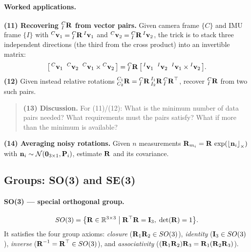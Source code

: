 \paragraph{Worked applications.}
\textbf{(11) Recovering ${}^{C}_{I}\boldsymbol{\mathbf{R}}$ from vector pairs.} Given camera frame $\{C\}$ and IMU frame $\{I\}$ with ${}^{C}\boldsymbol{\mathbf{v}}_1 = {}^{C}_{I}\boldsymbol{\mathbf{R}}\,{}^{I}\boldsymbol{\mathbf{v}}_1$ and ${}^{C}\boldsymbol{\mathbf{v}}_2 = {}^{C}_{I}\boldsymbol{\mathbf{R}}\,{}^{I}\boldsymbol{\mathbf{v}}_2$, the trick is to stack three independent directions (the third from the cross product) into an invertible matrix:
\begin{align}
\big[\,{}^{C}\boldsymbol{\mathbf{v}}_1 \;\; {}^{C}\boldsymbol{\mathbf{v}}_2 \;\; {}^{C}\boldsymbol{\mathbf{v}}_1\times{}^{C}\boldsymbol{\mathbf{v}}_2\,\big]
= {}^{C}_{I}\boldsymbol{\mathbf{R}}\,\big[\,{}^{I}\boldsymbol{\mathbf{v}}_1 \;\; {}^{I}\boldsymbol{\mathbf{v}}_2 \;\; {}^{I}\boldsymbol{\mathbf{v}}_1\times{}^{I}\boldsymbol{\mathbf{v}}_2\,\big].
\end{align}
\textbf{(12)} Given instead relative rotations ${}^{C_1}_{C_2}\boldsymbol{\mathbf{R}} = {}^{C}_{I}\boldsymbol{\mathbf{R}}\,{}^{I_1}_{I_2}\boldsymbol{\mathbf{R}}\,{}^{C}_{I}\boldsymbol{\mathbf{R}}^\top$, recover ${}^{C}_{I}\boldsymbol{\mathbf{R}}$ from two such pairs.
\begin{quote}
\textbf{(13) Discussion.} For (11)/(12): What is the minimum number of data pairs needed? What requirements must the pairs satisfy? What if more than the minimum is available?
\end{quote}
\textbf{(14) Averaging noisy rotations.} Given $n$ measurements $\boldsymbol{\mathbf{R}}_{m_i} = \boldsymbol{\mathbf{R}}\,\exp(\left\lfloor\boldsymbol{\mathbf{n}}_i\right\rfloor_{\times})$ with $\boldsymbol{\mathbf{n}}_i\sim\mathcal{N}(\boldsymbol{\mathbf{0}}_{3\times1},\boldsymbol{\mathbf{P}}_i)$, estimate $\boldsymbol{\mathbf{R}}$ and its covariance.

\subsection{Groups: SO(3) and SE(3)}

\paragraph{SO(3) --- special orthogonal group.}
\begin{align}
SO(3) = \big\{\boldsymbol{\mathbf{R}}\in\mathbb{R}^{3\times3} \;\big|\; \boldsymbol{\mathbf{R}}^\top\boldsymbol{\mathbf{R}} = \boldsymbol{\mathbf{I}}_3,\;\det(\boldsymbol{\mathbf{R}}) = 1\big\}.
\end{align}
It satisfies the four group axioms: \emph{closure} ($\boldsymbol{\mathbf{R}}_1\boldsymbol{\mathbf{R}}_2\in SO(3)$), \emph{identity} ($\boldsymbol{\mathbf{I}}_3\in SO(3)$), \emph{inverse} ($\boldsymbol{\mathbf{R}}^{-1} = \boldsymbol{\mathbf{R}}^\top\in SO(3)$), and \emph{associativity} ($(\boldsymbol{\mathbf{R}}_1\boldsymbol{\mathbf{R}}_2)\boldsymbol{\mathbf{R}}_3 = \boldsymbol{\mathbf{R}}_1(\boldsymbol{\mathbf{R}}_2\boldsymbol{\mathbf{R}}_3)$).


